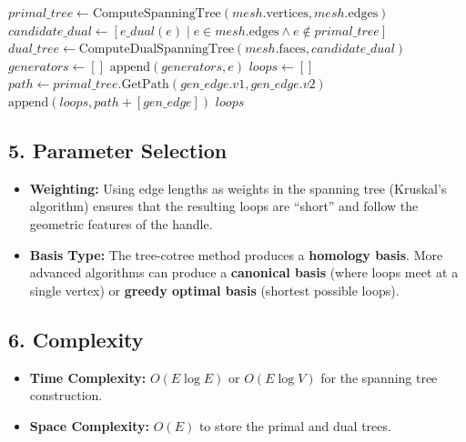 \begin{algorithm}
\caption{Find Tunnel Loops}
\label{alg:find_tunnel_loops}
\begin{algorithmic}[1]
    \State $primal\_tree \gets \text{ComputeSpanningTree}(mesh.\text{vertices}, mesh.\text{edges})$
    \State $candidate\_dual \gets [e\_dual(e) \mid e \in mesh.\text{edges} \wedge e \notin primal\_tree]$
    \State $dual\_tree \gets \text{ComputeDualSpanningTree}(mesh.\text{faces}, candidate\_dual)$
    \State $generators \gets []$
            \State $\text{append}(generators, e)$
        \EndIf
    \EndFor
    \State $loops \gets []$
        \State $path \gets primal\_tree.\text{GetPath}(gen\_edge.v1, gen\_edge.v2)$
        \State $\text{append}(loops, path + [gen\_edge])$
    \EndFor
    \State \Return $loops$
\EndFunction
\end{algorithmic}
\end{algorithm}

\subsection{5. Parameter Selection}

\begin{itemize}
    \item \textbf{Weighting:} Using edge lengths as weights in the spanning tree (Kruskal's algorithm) ensures that the resulting loops are ``short'' and follow the geometric features of the handle.
    \item \textbf{Basis Type:} The tree-cotree method produces a \textbf{homology basis}. More advanced algorithms can produce a \textbf{canonical basis} (where loops meet at a single vertex) or \textbf{greedy optimal basis} (shortest possible loops).
\end{itemize}

\subsection{6. Complexity}

\begin{itemize}
    \item \textbf{Time Complexity:} $O(E \log E)$ or $O(E \log V)$ for the spanning tree construction.
    \item \textbf{Space Complexity:} $O(E)$ to store the primal and dual trees.
\end{itemize}


